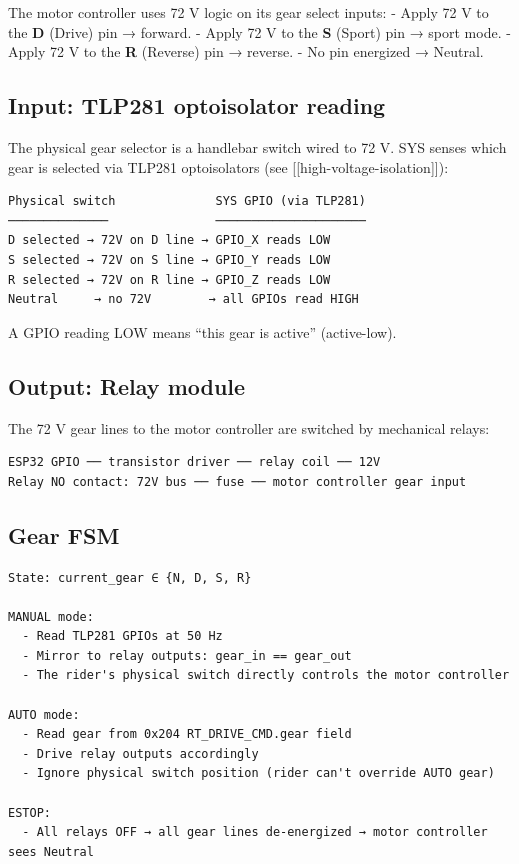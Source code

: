 \documentclass[12pt,a4paper,oneside]{report}
\begin{document}
The motor controller uses 72 V logic on its gear select inputs: - Apply 72 V to
the \textbf{D} (Drive) pin → forward. - Apply 72 V to the \textbf{S} (Sport) pin
→ sport mode. - Apply 72 V to the \textbf{R} (Reverse) pin → reverse. - No pin
energized → Neutral.

\subsection{Input: TLP281 optoisolator
reading}\label{input-tlp281-optoisolator-reading}

The physical gear selector is a handlebar switch wired to 72 V. SYS senses which
gear is selected via TLP281 optoisolators (see
{[}{[}high-voltage-isolation{]}{]}):

\begin{verbatim}
Physical switch              SYS GPIO (via TLP281)
──────────────               ─────────────────────
D selected → 72V on D line → GPIO_X reads LOW
S selected → 72V on S line → GPIO_Y reads LOW
R selected → 72V on R line → GPIO_Z reads LOW
Neutral     → no 72V        → all GPIOs read HIGH
\end{verbatim}

A GPIO reading LOW means ``this gear is active'' (active-low).

\subsection{Output: Relay module}\label{output-relay-module}

The 72 V gear lines to the motor controller are switched by mechanical relays:

\begin{verbatim}
ESP32 GPIO ── transistor driver ── relay coil ── 12V
Relay NO contact: 72V bus ── fuse ── motor controller gear input
\end{verbatim}

\subsection{Gear FSM}\label{gear-fsm}

\begin{verbatim}
State: current_gear ∈ {N, D, S, R}

MANUAL mode:
  - Read TLP281 GPIOs at 50 Hz
  - Mirror to relay outputs: gear_in == gear_out
  - The rider's physical switch directly controls the motor controller

AUTO mode:
  - Read gear from 0x204 RT_DRIVE_CMD.gear field
  - Drive relay outputs accordingly
  - Ignore physical switch position (rider can't override AUTO gear)

ESTOP:
  - All relays OFF → all gear lines de-energized → motor controller sees Neutral
\end{verbatim}
\end{document}
